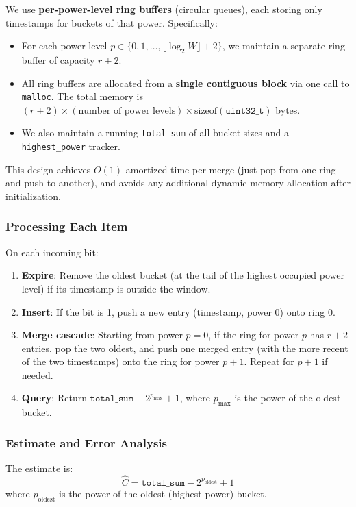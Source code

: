 \documentclass[11pt]{article}
\begin{document}
We use \textbf{per-power-level ring buffers} (circular queues), each storing only timestamps for buckets of that power. Specifically:
\begin{itemize}
\item For each power level $p \in \{0, 1, \ldots, \lfloor \log_2 W \rfloor + 2\}$, we maintain a separate ring buffer of capacity $r + 2$.
\item All ring buffers are allocated from a \textbf{single contiguous block} via one call to \texttt{malloc}. The total memory is $(r + 2) \times (\text{number of power levels}) \times \text{sizeof}(\texttt{uint32\_t})$ bytes.
\item We also maintain a running \texttt{total\_sum} of all bucket sizes and a \texttt{highest\_power} tracker.
\end{itemize}

\noindent
This design achieves $O(1)$ amortized time per merge (just pop from one ring and push to another), and avoids any additional dynamic memory allocation after initialization.

\subsubsection*{Processing Each Item}

On each incoming bit:
\begin{enumerate}
\item \textbf{Expire}: Remove the oldest bucket (at the tail of the highest occupied power level) if its timestamp is outside the window.
\item \textbf{Insert}: If the bit is 1, push a new entry (timestamp, power 0) onto ring 0.
\item \textbf{Merge cascade}: Starting from power $p = 0$, if the ring for power $p$ has $r + 2$ entries, pop the two oldest, and push one merged entry (with the more recent of the two timestamps) onto the ring for power $p + 1$. Repeat for $p + 1$ if needed.
\item \textbf{Query}: Return $\texttt{total\_sum} - 2^{p_{\max}} + 1$, where $p_{\max}$ is the power of the oldest bucket.
\end{enumerate}

\subsubsection*{Estimate and Error Analysis}

The estimate is:
\[
  \hat{C} = \texttt{total\_sum} - 2^{p_{\text{oldest}}} + 1
\]
where $p_{\text{oldest}}$ is the power of the oldest (highest-power) bucket.
\end{document}
